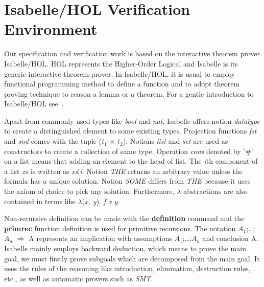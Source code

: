 \section{Isabelle/HOL Verification Environment}
Our specification and verification work is based on the interactive theorem prover Isabelle/HOL. HOL represents the Higher-Order Logical and Isabelle is its generic interactive theorem prover. In Isabelle/HOL, it is usual to employ functional programming method to define a function and to adopt theorem proving technique to reason a lemma or a theorem. For a gentle introduction to Isabelle/HOL see~\cite{reg_Isabelle/HOL}.

Apart from commonly used types like \emph{bool} and \emph{nat}, Isabelle offers notion \emph{datatype} to create a distinguished element to some existing types. Projection functions \emph{fst} and \emph{snd} comes with the tuple (\emph{$t_1$} $\times$ \emph{$t_2$}). Notions \emph{list} and \emph{set} are used as constructors to create a collection of same type. Operation \emph{cons} denoted by '$\#$' on a list means that adding an element to the head of list. The \emph{i}th component of a list \emph{xs} is written as \emph{xs}!\emph{i}. Notion \emph{THE} returns an arbitrary value unless the formula has a unique solution. Notion \emph{SOME} differs from \emph{THE} because it uses the
axiom of choice to pick any solution. Furthermore, $\lambda$-abstractions are also contained in terms like $\lambda$(\emph{x, y}). \emph{f x y}.

Non-recursive definition can be made with the \textbf{definition} command and the \textbf{primrec} function definition is used for primitive recursions. The notation {\isasymlbrakk} $A_1$;\dots;$A_n${\isasymrbrakk} $\Longrightarrow$ A represents an implication with assumptions $A_1$;\dots;$A_n$ and conclusion A. Isabelle mainly employs backward deduction, which means to prove the main goal, we must firstly prove subgoals which are decomposed from the main goal. It uses the rules of the reasoning like introduction, elimination, destruction rules, etc., as well as automatic provers such as \emph{SMT}.


